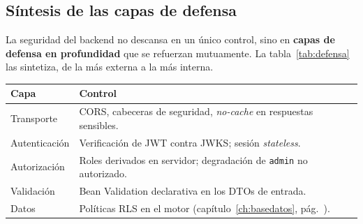 \subsection{Síntesis de las capas de defensa}
\label{subsec:defensa_capas}

La seguridad del backend no descansa en un único control, sino en \textbf{capas de defensa
en profundidad} que se refuerzan mutuamente. La tabla~\ref{tab:defensa} las sintetiza, de
la más externa a la más interna.

\vspace{0.2cm}
\noindent
\renewcommand{\arraystretch}{1.3}
\fontsize{8.5}{10.2}\selectfont\sffamily
\begin{tabularx}{\textwidth}{|L{3.2cm}|Y|}
\hline
{}
\sffamily\textbf{Capa} & \sffamily\textbf{Control} \\
\hline
Transporte & CORS, cabeceras de seguridad, \textit{no-cache} en respuestas sensibles. \\ \hline
{}
Autenticación & Verificación de JWT contra JWKS; sesión \textit{stateless}. \\ \hline
Autorización & Roles derivados en servidor; degradación de \texttt{admin} no autorizado. \\ \hline
{}
Validación & Bean Validation declarativa en los DTOs de entrada. \\ \hline
Datos & Políticas RLS en el motor (capítulo~\ref{ch:basedatos}, pág.~\pageref{ch:basedatos}). \\ \hline
\end{tabularx}
\label{tab:defensa}
